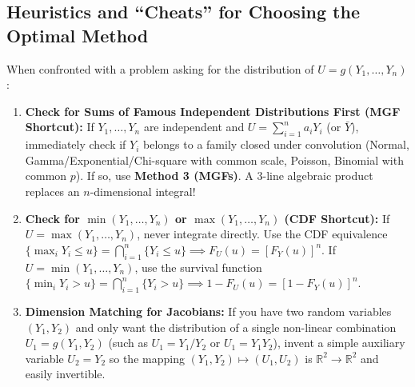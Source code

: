 \documentclass[11pt, letterpaper]{article}
\theoremstyle{definition}
\theoremstyle{remark}
\newcommand{\R}{\mathbb{R}}
\begin{document}
\begin{center}
\end{center}

\subsection{Heuristics and ``Cheats'' for Choosing the Optimal Method}

When confronted with a problem asking for the distribution of $U = g(Y_1, \dots, Y_n)$:
\begin{enumerate}[label=\textbf{Heuristic \arabic*:}]
    \item \textbf{Check for Sums of Famous Independent Distributions First (MGF Shortcut):} If $Y_1, \dots, Y_n$ are independent and $U = \sum_{i=1}^n a_i Y_i$ (or $\bar{Y}$), immediately check if $Y_i$ belongs to a family closed under convolution (Normal, Gamma/Exponential/Chi-square with common scale, Poisson, Binomial with common $p$). If so, use \textbf{Method 3 (MGFs)}. A 3-line algebraic product replaces an $n$-dimensional integral!
    \item \textbf{Check for $\min(Y_1, \dots, Y_n)$ or $\max(Y_1, \dots, Y_n)$ (CDF Shortcut):} If $U = \max(Y_1, \dots, Y_n)$, never integrate directly. Use the CDF equivalence $\{ \max_i Y_i \le u \} = \bigcap_{i=1}^n \{Y_i \le u\} \implies F_U(u) = [F_Y(u)]^n$. If $U = \min(Y_1, \dots, Y_n)$, use the survival function $\{ \min_i Y_i > u \} = \bigcap_{i=1}^n \{Y_i > u\} \implies 1 - F_U(u) = [1 - F_Y(u)]^n$.
    \item \textbf{Dimension Matching for Jacobians:} If you have two random variables $(Y_1, Y_2)$ and only want the distribution of a single non-linear combination $U_1 = g(Y_1, Y_2)$ (such as $U_1 = Y_1 / Y_2$ or $U_1 = Y_1 Y_2$), invent a simple auxiliary variable $U_2 = Y_2$ so the mapping $(Y_1, Y_2) \mapsto (U_1, U_2)$ is $\R^2 \to \R^2$ and easily invertible.
\end{enumerate}
\end{document}
